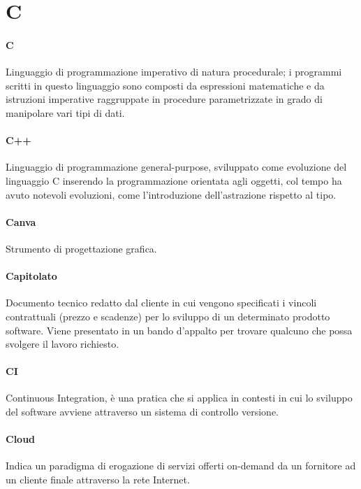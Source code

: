 \documentclass[]{article}
\begin{document}
	\newpage

	\section*{C}

	\paragraph*{C}
	Linguaggio di programmazione imperativo di natura procedurale; i programmi scritti in questo linguaggio sono composti da espressioni matematiche e da istruzioni imperative raggruppate in procedure parametrizzate in grado di manipolare vari tipi di dati.

	\paragraph*{C++}
	Linguaggio di programmazione general-purpose, sviluppato come evoluzione del linguaggio C inserendo la programmazione orientata agli oggetti, col tempo ha avuto notevoli evoluzioni, come l'introduzione dell'astrazione rispetto al tipo.

	\paragraph*{Canva}
	Strumento di progettazione grafica.

	\paragraph*{Capitolato}
	Documento tecnico redatto dal cliente in cui vengono specificati i vincoli contrattuali	(prezzo e scadenze) per lo sviluppo di un determinato prodotto software. Viene presentato in un bando d'appalto per trovare qualcuno che possa svolgere il lavoro richiesto.

	\paragraph*{CI}
	Continuous Integration, è una pratica che si applica in contesti in cui lo sviluppo del software avviene attraverso un sistema di controllo versione.

	\paragraph*{Cloud}
	Indica un paradigma di erogazione di servizi offerti on-demand da un fornitore ad un cliente finale attraverso la rete Internet.
\end{document}
